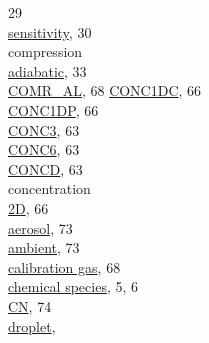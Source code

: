 \documentclass[
  english,
]{book}
\begin{document}
29\\
\hspace*{0.333em}\hspace*{0.333em}\href{./4-the-state-of-the-atmosphere.html\#akrd}{sensitivity},
30\\
compression\\
\hspace*{0.333em}\hspace*{0.333em}\href{./4-the-state-of-the-atmosphere.html\#recovery-t}{adiabatic},
33\\
\href{./6-air-chemistry-measurements.html\#comr-al}{COMR\_AL}, 68
\href{./5-cloud-physics-variables.html\#conc2d}{CONC1DC}, 66\\
\href{./5-cloud-physics-variables.html\#conc2d}{CONC1DP}, 66\\
\href{./5-cloud-physics-variables.html\#concentration}{CONC3}, 63\\
\href{./5-cloud-physics-variables.html\#concentration}{CONC6}, 63\\
\href{./5-cloud-physics-variables.html\#concentration}{CONCD}, 63\\
concentration\\
\hspace*{0.333em}\hspace*{0.333em}\href{./5-cloud-physics-variables.html\#conc2d}{2D},
66\\
\hspace*{0.333em}\hspace*{0.333em}\href{./7-aerosol-particle-measurements.html\#concu-concp}{aerosol},
73\\
\hspace*{0.333em}\hspace*{0.333em}\href{./7-aerosol-particle-measurements.html\#concn}{ambient},
73\\
\hspace*{0.333em}\hspace*{0.333em}\href{./6-air-chemistry-measurements.html\#comr-al}{calibration
gas}, 68\\
\hspace*{0.333em}\hspace*{0.333em}\href{./2-general-information-about-data-files.html\#units-and-abbreviations}{chemical
species}, 5, 6\\
\hspace*{0.333em}\hspace*{0.333em}\href{./7-aerosol-particle-measurements.html\#concn}{CN},
74\\
\hspace*{0.333em}\hspace*{0.333em}\href{./5-cloud-physics-variables.html\#concentration}{droplet},
\end{document}
